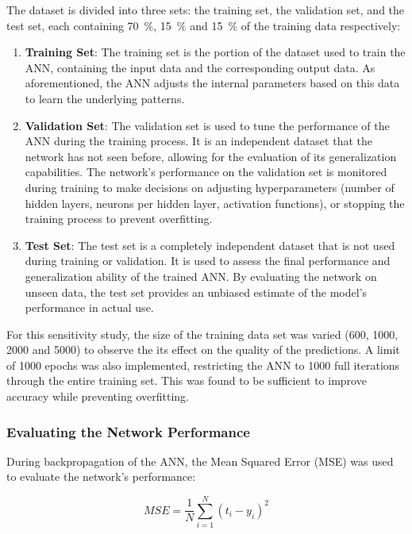 The dataset is divided into three sets: the training set, the validation set, and the test set, each containing 70~$\%$, 15~$\%$ and 15~$\%$ of the training data respectively:

\begin{enumerate}
	\item \textbf{Training Set}: The training set is the portion of the dataset used to train the ANN, containing the input data and the corresponding output data. As aforementioned, the ANN adjusts the internal parameters based on this data to learn the underlying patterns.
	\item \textbf{Validation Set}: The validation set is used to tune the performance of the ANN during the training process. It is an independent dataset that the network has not seen before, allowing for the evaluation of its generalization capabilities. The network's performance on the validation set is monitored during training to make decisions on adjusting hyperparameters (number of hidden layers, neurons per hidden layer, activation functions), or stopping the training process to prevent overfitting.
	\item \textbf{Test Set}: The test set is a completely independent dataset that is not used during training or validation. It is used to assess the final performance and generalization ability of the trained ANN. By evaluating the network on unseen data, the test set provides an unbiased estimate of the model's performance in actual use.
\end{enumerate}

For this sensitivity study, the size of the training data set was varied (600, 1000, 2000 and 5000) to observe the its effect on the quality of the predictions. A limit of 1000 epochs was also implemented, restricting the ANN to 1000 full iterations through the entire training set. This was found to be sufficient to improve accuracy while preventing overfitting.

\subsubsection{Evaluating the Network Performance}

During backpropagation of the ANN, the Mean Squared Error (MSE) was used to evaluate the network's performance:

\begin{equation}\label{MSE}
	M S E=\frac{1}{N} \sum_{i=1}^N\left(t_i-y_i\right)^2
\end{equation}

